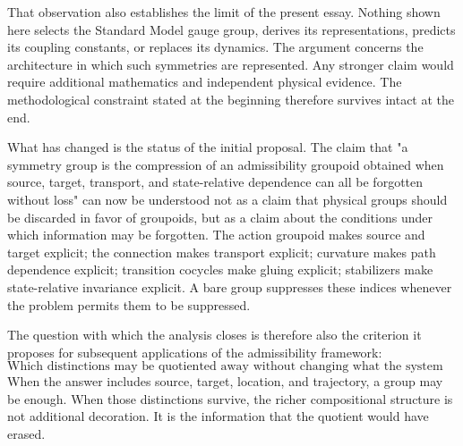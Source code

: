 \documentclass[11pt]{article}
\begin{document}
That observation also establishes the limit of the present essay. Nothing shown here selects the Standard Model gauge group, derives its representations, predicts its coupling constants, or replaces its dynamics. The argument concerns the architecture in which such symmetries are represented. Any stronger claim would require additional mathematics and independent physical evidence. The methodological constraint stated at the beginning therefore survives intact at the end.

What has changed is the status of the initial proposal. The claim that "a symmetry group is the compression of an admissibility groupoid obtained when source, target, transport, and state-relative dependence can all be forgotten without loss" can now be understood not as a claim that physical groups should be discarded in favor of groupoids, but as a claim about the conditions under which information may be forgotten. The action groupoid makes source and target explicit; the connection makes transport explicit; curvature makes path dependence explicit; transition cocycles make gluing explicit; stabilizers make state-relative invariance explicit. A bare group suppresses these indices whenever the problem permits them to be suppressed.

The question with which the analysis closes is therefore also the criterion it proposes for subsequent applications of the admissibility framework:
\[
\boxed{
\text{Which distinctions may be quotiented away without changing what the system can physically distinguish?}
}
\]
When the answer includes source, target, location, and trajectory, a group may be enough. When those distinctions survive, the richer compositional structure is not additional decoration. It is the information that the quotient would have erased.
\end{document}
